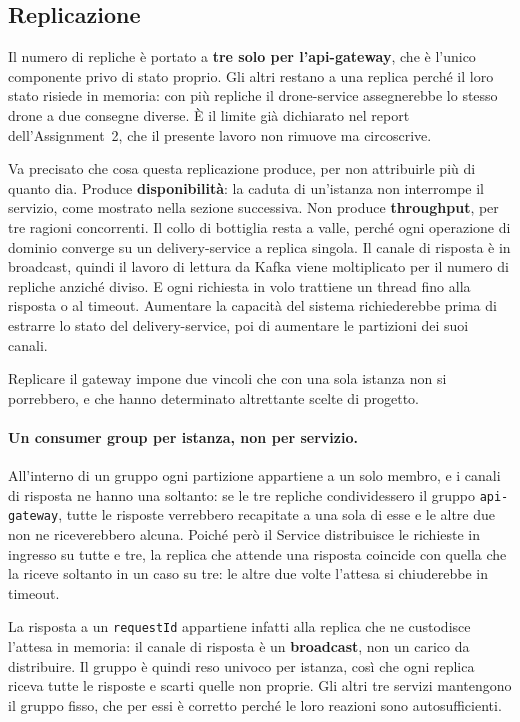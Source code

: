 \documentclass[12pt,a4paper]{article}
\begin{document}
\subsection{Replicazione}

Il numero di repliche \`e portato a \textbf{tre solo per l'api-gateway}, che \`e l'unico componente
privo di stato proprio. Gli altri restano a una replica perch\'e il loro stato risiede in memoria:
con pi\`u repliche il drone-service assegnerebbe lo stesso drone a due consegne diverse. \`E il
limite gi\`a dichiarato nel report dell'Assignment~2, che il presente lavoro non rimuove ma
circoscrive.

Va precisato che cosa questa replicazione produce, per non attribuirle pi\`u di quanto dia. Produce
\textbf{disponibilit\`a}: la caduta di un'istanza non interrompe il servizio, come mostrato nella
sezione successiva. Non produce \textbf{throughput}, per tre ragioni concorrenti. Il collo di
bottiglia resta a valle, perch\'e ogni operazione di dominio converge su un delivery-service a
replica singola. Il canale di risposta \`e in broadcast, quindi il lavoro di lettura da Kafka viene
moltiplicato per il numero di repliche anzich\'e diviso. E ogni richiesta in volo trattiene un
thread fino alla risposta o al timeout. Aumentare la capacit\`a del sistema richiederebbe prima di
estrarre lo stato del delivery-service, poi di aumentare le partizioni dei suoi canali.

Replicare il gateway impone due vincoli che con una sola istanza non si porrebbero, e che hanno
determinato altrettante scelte di progetto.

\paragraph{Un consumer group per istanza, non per servizio.} All'interno di un gruppo ogni
partizione appartiene a un solo membro, e i canali di risposta ne hanno una soltanto: se le tre
repliche condividessero il gruppo \texttt{api-gateway}, tutte le risposte verrebbero recapitate a
una sola di esse e le altre due non ne riceverebbero alcuna. Poich\'e per\`o il Service distribuisce
le richieste in ingresso su tutte e tre, la replica che attende una risposta coincide con quella che
la riceve soltanto in un caso su tre: le altre due volte l'attesa si chiuderebbe in timeout.

La risposta a un \texttt{requestId} appartiene infatti alla replica che ne custodisce l'attesa in
memoria: il canale di risposta \`e un \textbf{broadcast}, non un carico da distribuire. Il gruppo
\`e quindi reso univoco per istanza, cos\`i che ogni replica riceva tutte le risposte e scarti
quelle non proprie. Gli altri tre servizi mantengono il gruppo fisso, che per essi \`e corretto
perch\'e le loro reazioni sono autosufficienti.
\end{document}
